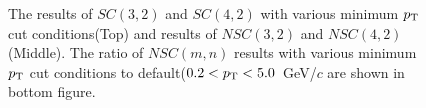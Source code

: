 \begin{figure}[p]
\begin{center}
        \caption{The results of $SC(3,2)$ and $SC(4,2)$ with various minimum $p_{\rm{T}}$ cut conditions(Top) and results of  $NSC(3,2)$ and $NSC(4,2)$(Middle). The ratio of $NSC(m,n)$ results with various minimum $p_{\rm{T}}$ cut conditions to default($0.2 < p_{\rm{T}} < 5.0$~GeV/$c$ are shown in bottom figure.}
        \label{fig:ptdep}
        \end{center}   
     \end{figure}


	\begin{figure}[p]
		\begin{center}

\end{center}
\end{figure}
